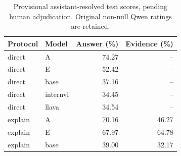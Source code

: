 \begin{table}[t]
\centering
\caption{Provisional assistant-resolved test scores, pending human adjudication. Original non-null Qwen ratings are retained.}
\begin{tabular}{llrr}
\toprule
Protocol & Model & Answer (\%) & Evidence (\%) \\
\midrule
direct & A & 74.27 & -- \\
direct & E & 52.42 & -- \\
direct & base & 37.16 & -- \\
direct & internvl & 34.45 & -- \\
direct & llava & 34.54 & -- \\
explain & A & 70.16 & 46.27 \\
explain & E & 67.97 & 64.78 \\
explain & base & 39.00 & 32.17 \\
\bottomrule
\end{tabular}
\end{table}
